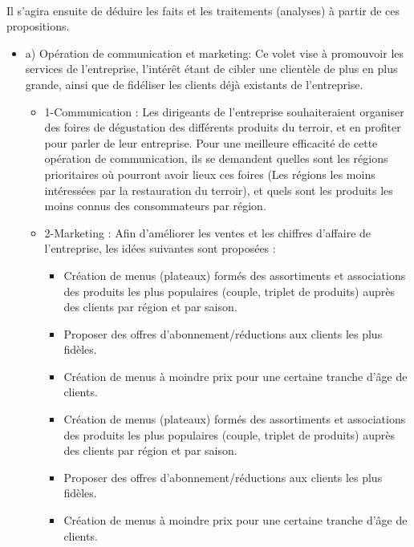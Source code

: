\paragraph{}Il s’agira ensuite de déduire les faits et les traitements (analyses) à partir de ces propositions.
\begin{itemize}
    \item a) Opération de communication et marketing: Ce volet vise à promouvoir les services de l’entreprise, l’intérêt étant de cibler une clientèle de plus en plus grande, ainsi que de fidéliser les clients déjà existants de l’entreprise.
        \\
        \begin{itemize}
            \item 1-Communication : Les dirigeants de l’entreprise souhaiteraient organiser des foires de dégustation des différents produits du terroir, et en profiter pour parler de leur entreprise.  Pour une meilleure efficacité de cette opération de communication, ils se demandent quelles sont les régions prioritaires où pourront avoir lieux ces foires (Les régions les moins intéressées par la restauration du terroir), et quels sont les produits les moins connus des consommateurs par région.
            \item 2-Marketing : Afin d’améliorer les ventes et les chiffres d’affaire de l’entreprise, les idées suivantes sont proposées : 
                \\
                \begin{itemize}
                    \item Création de menus (plateaux) formés des assortiments et associations des produits les plus populaires (couple, triplet de produits) auprès des clients par région et par saison.
                    \item Proposer des offres d’abonnement/réductions aux clients les plus fidèles.
                    \item Création de menus à moindre prix pour une certaine tranche d’âge de clients.
                    \item Création de menus (plateaux) formés des assortiments et associations des produits les plus populaires (couple, triplet de produits) auprès des clients par région et par saison.
                    \item Proposer des offres d’abonnement/réductions aux clients les plus fidèles.
                    \item Création de menus à moindre prix pour une certaine tranche d’âge de clients.

\end{itemize}
\end{itemize}
\end{itemize}
